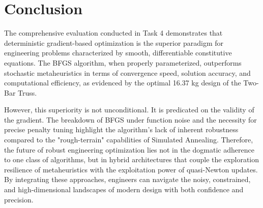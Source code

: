\section{Conclusion}

The comprehensive evaluation conducted in Task 4 demonstrates that deterministic gradient-based optimization is the superior paradigm for engineering problems characterized by smooth, differentiable constitutive equations. The BFGS algorithm, when properly parameterized, outperforms stochastic metaheuristics in terms of convergence speed, solution accuracy, and computational efficiency, as evidenced by the optimal 16.37 kg design of the Two-Bar Truss.

However, this superiority is not unconditional. It is predicated on the validity of the gradient. The breakdown of BFGS under function noise and the necessity for precise penalty tuning highlight the algorithm's lack of inherent robustness compared to the "rough-terrain" capabilities of Simulated Annealing. Therefore, the future of robust engineering optimization lies not in the dogmatic adherence to one class of algorithms, but in hybrid architectures that couple the exploration resilience of metaheuristics with the exploitation power of quasi-Newton updates. By integrating these approaches, engineers can navigate the noisy, constrained, and high-dimensional landscapes of modern design with both confidence and precision.

\begin{table}[H]
    \centering
    \caption{Final Summary of Algorithm Applicability}
    \label{tab:conclusion_summary}
\end{table}
